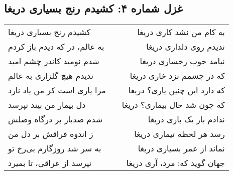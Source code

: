\begin{center}
\section*{غزل شماره ۴: کشیدم رنج بسیاری دریغا}
\label{sec:004}
\begin{longtable}{l p{0.5cm} r}
کشیدم رنج بسیاری دریغا
&&
به کام من نشد کاری دریغا
\\
به عالم، در که دیدم باز کردم
&&
ندیدم روی دلداری دریغا
\\
شدم نومید کاندر چشم امید
&&
نیامد خوب رخساری دریغا
\\
ندیدم هیچ گلزاری به عالم
&&
که در چشمم نزد خاری دریغا
\\
مرا یاری است کز من یاد نارد
&&
که دارد این چنین یاری؟ دریغا
\\
دل بیمار من بیند نپرسد
&&
که چون شد حال بیماری؟ دریغا
\\
شدم صدبار بر درگاه وصلش
&&
ندادم بار یک باری دریغا
\\
ز اندوه فراقش بر دل من
&&
رسد هر لحظه تیماری دریغا
\\
به سر شد روزگارم بی‌رخ تو
&&
نماند از عمر بسیاری دریغا
\\
نپرسد از عراقی، تا بمیرد
&&
جهان گوید که: مرد، آری دریغا
\\
\end{longtable}
\end{center}
